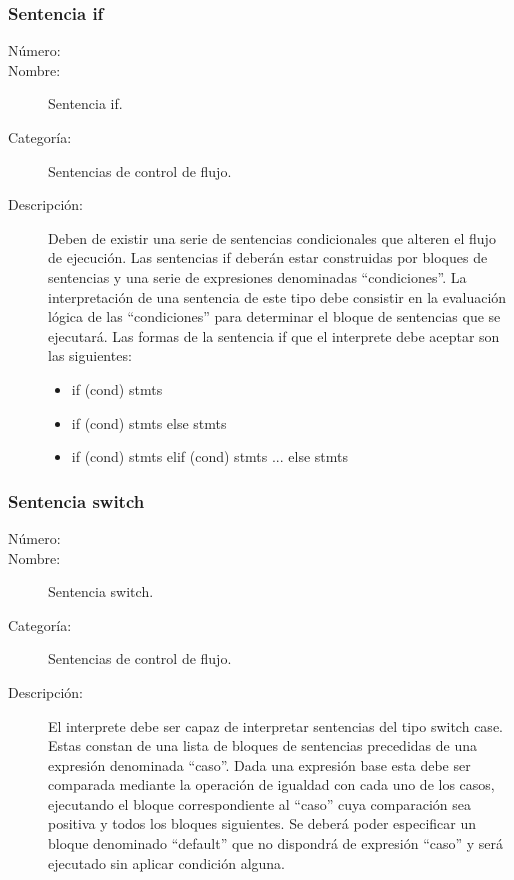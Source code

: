 \subsubsection{Sentencia if} 
\begin{framed}
	\begin{description}
		\item [Número:] \cn
		\item [Nombre:] Sentencia if.
		\item [Categoría:] Sentencias de control de flujo.
		\item [Descripción:] Deben de existir una serie de sentencias condicionales que alteren el flujo de ejecución. Las  
		sentencias if deberán estar construidas por bloques de sentencias y una serie de expresiones denominadas ``condiciones''.
		La interpretación de una sentencia de este tipo debe consistir en la evaluación lógica de las ``condiciones'' para determinar el
		bloque de sentencias que se ejecutará. Las formas de la sentencia if que el interprete debe aceptar son las siguientes:
		\begin{itemize}
			\item if (cond) stmts
			\item if (cond) stmts else stmts
			\item if (cond) stmts elif (cond) stmts ... else stmts
		\end{itemize}
	\end {description}
\end{framed}

\subsubsection{Sentencia switch}
\begin{framed}
	\begin{description}
		\item [Número:] \cn
		\item [Nombre:] Sentencia switch.
		\item [Categoría:] Sentencias de control de flujo.
		\item [Descripción:] El interprete debe ser capaz de interpretar sentencias del tipo switch case. Estas
		constan de una lista de bloques de sentencias precedidas de una expresión denominada ``caso''. Dada una expresión base
		esta debe ser comparada mediante la operación de igualdad con cada uno de los casos, ejecutando el bloque correspondiente al ``caso''
		cuya comparación sea positiva y todos los bloques siguientes. Se deberá poder especificar un bloque denominado ``default''
		que no dispondrá de expresión ``caso'' y será ejecutado sin aplicar condición alguna.
	\end {description}
\end{framed}

